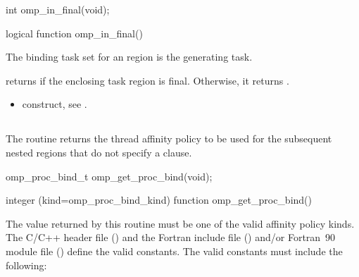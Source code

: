 \format
\begin{ccppspecific}
\begin{ompcFunction}
int omp_in_final(void);
\end{ompcFunction}
\end{ccppspecific}

\begin{fortranspecific}
\begin{ompfFunction}
logical function omp_in_final()
\end{ompfFunction}
\end{fortranspecific}

\binding
The binding task set for an  region is the generating task.

\effect
{} returns  if the enclosing task region 
is final. Otherwise, it returns .

\crossreferences
\begin{itemize}
\item {} construct, see
.
\end{itemize}



\subsection{}
\label{subsec:omp_get_proc_bind}
\summary
The  routine returns the thread affinity 
policy to be used for the subsequent nested  regions 
that do not specify a  clause.

\format
\begin{ccppspecific}
\begin{ompcFunction}
omp_proc_bind_t omp_get_proc_bind(void);
\end{ompcFunction}
\end{ccppspecific}

\begin{fortranspecific}
\begin{ompfFunction}
integer (kind=omp_proc_bind_kind) function omp_get_proc_bind()
\end{ompfFunction}
\end{fortranspecific}

\constraints
The value returned by this routine must be one of the valid affinity 
policy kinds. The C/C++ header file () and the Fortran 
include file () and/or Fortran~90 module file 
() define the valid constants. The valid constants 
must include the following:

